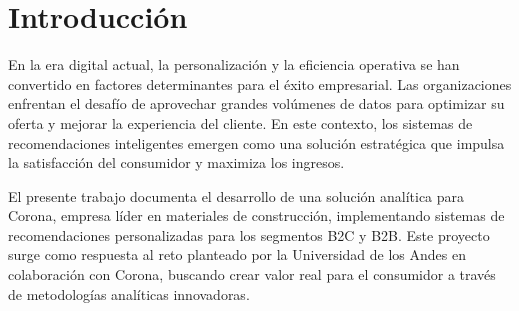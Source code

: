 \documentclass[twocolumn]{article}
\begin{document}
\section{Introducción}

En la era digital actual, la personalización y la eficiencia operativa se han convertido en factores determinantes para el éxito empresarial. Las organizaciones enfrentan el desafío de aprovechar grandes volúmenes de datos para optimizar su oferta y mejorar la experiencia del cliente. En este contexto, los sistemas de recomendaciones inteligentes emergen como una solución estratégica que impulsa la satisfacción del consumidor y maximiza los ingresos.

El presente trabajo documenta el desarrollo de una solución analítica para Corona, empresa líder en materiales de construcción, implementando sistemas de recomendaciones personalizadas para los segmentos B2C y B2B. Este proyecto surge como respuesta al reto planteado por la Universidad de los Andes en colaboración con Corona, buscando crear valor real para el consumidor a través de metodologías analíticas innovadoras.
\end{document}
